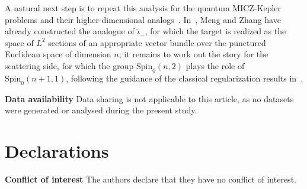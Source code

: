 \documentclass[11pt]{article}
\theoremstyle{plain}
\theoremstyle{definition}
\theoremstyle{remark}
\newcommand{\Spin}{\mathrm{Spin}}
\begin{document}
A natural next step is to repeat this analysis for the quantum
MICZ-Kepler problems and their higher-dimensional
analogs~\cite{Meng2007}. In~\cite{MengZhang2011}, Meng and Zhang have already constructed the analogue of $\hat\iota_{-}$, for which the target is realized as the space of $L^{2}$ sections of an appropriate vector bundle over the punctured Euclidean space of dimension $n$; it remains to work out the story for the scattering side, for which the group $\Spin_0(n,2)$ plays the role of $\Spin_0(n+1,1)$, following the guidance of the classical regularization results in~\cite{Meng2023}.


\bigskip
\noindent\textbf{Data availability} Data sharing is not applicable to this article, as no datasets were generated or analysed during the present study.

\section*{Declarations}
\noindent\textbf{Conflict of interest} The authors declare that they have no conflict of interest.
\end{document}
